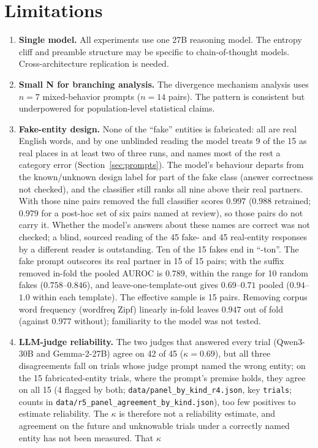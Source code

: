 \documentclass[11pt,a4paper]{article}
\begin{document}
\section{Limitations}

\begin{enumerate}[nosep]
    \item \textbf{Single model.} All experiments use one 27B reasoning
          model. The entropy cliff and preamble structure may be specific
          to chain-of-thought models. Cross-architecture replication is
          needed.
    \item \textbf{Small N for branching analysis.} The divergence mechanism
          analysis uses $n{=}7$ mixed-behavior prompts ($n{=}14$ pairs).
          The pattern is consistent but underpowered for population-level
          statistical claims.
    \item \textbf{Fake-entity design.} None of the ``fake'' entities is
          fabricated: all are real English words, and by one unblinded reading the model treats 9 of the 15 as real places in at least two of three runs, and names most of the rest a category error (Section~\ref{sec:prompts}). The model's behaviour departs from the known/unknown design label for part of the fake class (answer correctness not checked), and the classifier still ranks all nine above their real partners. With those nine pairs removed the full classifier scores $0.997$ ($0.988$ retrained; $0.979$ for a post-hoc set of six pairs named at review), so those pairs do not carry it. Whether the model's answers about these names are correct was not checked; a blind, sourced reading of the 45 fake- and 45 real-entity responses by a different reader is outstanding. Ten
          of the 15 fakes end in ``-ton''. The fake prompt outscores its
          real partner in 15 of 15 pairs; with the suffix removed in-fold
          the pooled AUROC is $0.789$, within the range for 10 random fakes ($0.758$--$0.846$), and leave-one-template-out gives $0.69$--$0.71$ pooled
          ($0.94$--$1.0$ within each template). The effective sample is
          15 pairs. Removing corpus word frequency (wordfreq Zipf) linearly in-fold leaves $0.947$ out of fold (against $0.977$ without); familiarity to the model was not tested.
    \item \textbf{LLM-judge reliability.} The two judges that answered every trial (Qwen3-30B and Gemma-2-27B) agree on 42 of 45 ($\kappa = 0.69$), but all three disagreements fall on trials whose judge prompt named the wrong entity; on the 15 fabricated-entity trials, where the prompt's premise holds, they agree on all 15 (4 flagged by both; \texttt{data/\allowbreak panel\_\allowbreak by\_\allowbreak kind\_\allowbreak r4.json}, key \texttt{trials}; counts in \texttt{data/\allowbreak r5\_\allowbreak panel\_\allowbreak agreement\_\allowbreak by\_\allowbreak kind.json}), too few positives to estimate reliability. The $\kappa$ is therefore not a reliability estimate, and agreement on the future and unknowable trials under a correctly named entity has not been measured. That $\kappa$

\end{enumerate}
\end{document}
